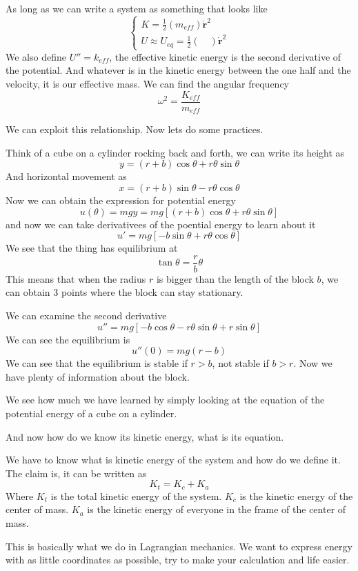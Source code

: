 \documentclass[12pt]{article}
\newcommand{\sqbkt}[1]{\left[ #1 \right]}
\newcommand{\paren}[1]{\left( #1 \right)}
\begin{document}
As long as we can write a system as something that looks like
\[
\begin{cases}
    K = \frac{1}{2}\paren{m_{eff}}\dot{\mathbf{r}}^2\\
    U \approx U_{eq} = \frac{1}{2}\paren{\quad}\dot{\mathbf{r}}^2
\end{cases}
\]
We also define $U'' = k_{eff}$, the effective kinetic energy is the second derivative of the potential. And whatever is in the kinetic energy between the one half and the velocity, it is our effective mass. We can find the angular frequency
\[
\omega^2 = \frac{K_{eff}}{m_{eff}}
\]

We can exploit this relationship. Now lets do some practices. 

Think of a cube on a cylinder rocking back and forth, we can write its height as
\[
y = (r+b)\cos\theta + r\theta\sin\theta
\]
And horizontal movement as
\[
x = (r+b)\sin\theta-r\theta\cos\theta
\]
Now we can obtain the expression for potential energy
\[
u(\theta) = mgy = mg\sqbkt{(r+b)\cos\theta + r\theta\sin\theta}
\]
and now we can take derivativees of the poential energy to learn about it
\[
u' = mg\sqbkt{-b\sin\theta + r\theta\cos\theta}
\]
We see that the thing has equilibrium at
\[
\tan\theta = \frac{r}{b}\theta
\]
This means that when the radius $r$ is bigger than the length of the block $b$, we can obtain 3 points where the block can stay stationary.

We can examine the second derivative
\[
u'' = mg\sqbkt{-b\cos\theta - r\theta\sin\theta+r\sin\theta}
\]
We can see the equilibrium is
\[
u''(0) = mg\paren{r-b}
\]
We can see that the equilibrium is stable if $r>b$, not stable if $b>r$. Now we have plenty of information about the block. 

We see how much we have learned by simply looking at the equation of the potential energy of a cube on a cylinder. 

And now how do we know its kinetic energy, what is its equation. 

We have to know what is kinetic energy of the system and how do we define it. The claim is, it can be written as
\[
K_t = K_c + K_a
\]
Where $K_t$ is the total kinetic energy of the system. $K_c$ is the kinetic energy of the center of mass. $K_a$ is the kinetic energy of everyone in the frame of the center of mass. 

This is basically what we do in Lagrangian mechanics. We want to express energy with as little coordinates as possible, try to make your calculation and life easier. 
\end{document}
